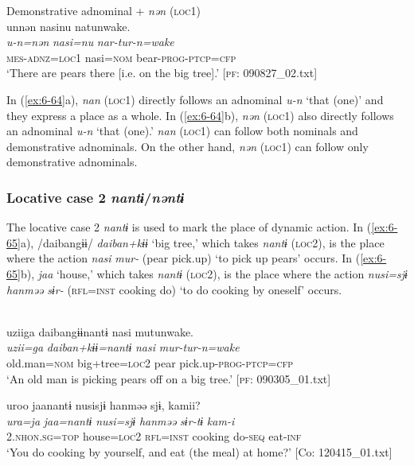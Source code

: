 \ex Demonstrative adnominal + \textit{nən} (\textsc{loc1})\\
{\TM}
\glll  unnən  nasinu  natunwake.\\
\textit{u-n=nən}  \textit{nasi=nu}  \textit{nar-tur-n=wake}\\
\textsc{mes}-\textsc{adnz}=\textsc{loc1}  nasi=\textsc{nom}  bear-\textsc{prog}-\textsc{ptcp}=\textsc{cfp}\\
\glt ‘There are pears there [i.e. on the big tree].’ [\textsc{pf}: 090827\_02.txt]
\z
\z

In (\ref{ex:6-64}a), \textit{nan} (\textsc{loc1}) directly follows an adnominal \textit{u-n} ‘that (one)’ and they express a place as a whole. In (\ref{ex:6-64}b), \textit{nən} (\textsc{loc1}) also directly follows an adnominal \textit{u-n} ‘that (one).’ \textit{nan} (\textsc{loc1}) can follow both nominals and demonstrative adnominals. On the other hand, \textit{nən} (\textsc{loc1}) can follow only demonstrative adnominals.

\subsubsection{Locative case 2 \textit{nantɨ}/\textit{nəntɨ}}

The locative case 2 \textit{nantɨ} is used to mark the place of dynamic action. In (\ref{ex:6-65}a), /daibangɨɨ/ \textit{daiban+kɨɨ} ‘big tree,’ which takes \textit{nantɨ} (\textsc{loc2}), is the place where the action \textit{nasi} \textit{mur-} (pear pick.up) ‘to pick up pears’ occurs. In (\ref{ex:6-65}b), \textit{jaa} ‘house,’ which takes \textit{nantɨ} (\textsc{loc2}), is the place where the action \textit{nusi=sjɨ} \textit{hanməə} \textit{sɨr-} (\textsc{rfl}=\textsc{inst} cooking do) ‘to do cooking by oneself’ occurs.

\ea\label{ex:6-65}
\ea\relax[= \REF{ex:6-53}]\\
{\TM}
\glll  uziiga  daibangɨɨnantɨ  nasi  mutunwake.\\
\textit{uzii=ga}  \textit{daiban+kɨɨ=nantɨ}  \textit{nasi}  \textit{mur-tur-n=wake}\\
old.man=\textsc{nom}  big+tree=\textsc{loc2}  pear  pick.up-\textsc{prog}-\textsc{ptcp}=\textsc{cfp}\\
\glt ‘An old man is picking pears off on a big tree.’ [\textsc{pf}: 090305\_01.txt]

\ex {\TM}  uroo  jaanantɨ  nusisjɨ  hanməə  sjɨ,  kamii?\\
\glll \textit{ura=ja}  \textit{jaa=nantɨ}  \textit{nusi=sjɨ}  \textit{hanməə}  \textit{sɨr-tɨ}  \textit{kam-i}\\
2.\textsc{nhon}.\textsc{sg}=\textsc{top}  house=\textsc{loc2}  \textsc{rfl}=\textsc{inst}  cooking  do-\textsc{seq}  eat-\textsc{inf}\\
\glt ‘You do cooking by yourself, and eat (the meal) at home?’ [Co: 120415\_01.txt]
\z
\z

